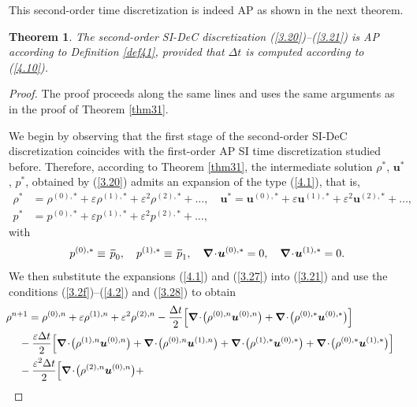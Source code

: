 \documentclass[preprint,12pt]{elsarticle}
\newtheorem{theorem}{Theorem}[section]
\def\bnabla{\bm{\nabla}}
\newcommand{\dt}{\Delta t}
\newcommand{\ve}{\varepsilon}
\newcommand\eref[1]{(\ref{#1})}
\newcommand*\xbar[1]{%
	\hbox{%
		\vbox{%
			\hrule height 0.5pt %
			\kern0.4ex%
			\hbox{%
				\kern-0.05em%
				\ensuremath{#1}%
				\kern-0.00em%
			}%
		}%
	}%
}
\begin{document}
This second-order time discretization is indeed AP as shown in the next theorem.
\begin{theorem}
	The second-order SI-DeC discretization \eref{3.20}--\eref{3.21} is AP according to Definition \ref{def41}, provided that $\dt$ is computed
	according to \eref{4.10}.
\end{theorem}
\begin{proof}
	The proof proceeds along the same lines and uses the same arguments as in the proof of Theorem \ref{thm31}.
	
	We begin by observing that the first stage of the second-order SI-DeC discretization coincides with the first-order AP SI time 
	discretization studied before. Therefore, according to Theorem \ref{thm31}, the intermediate solution $\rho^*$, $\bm u^*$, $p^*$, obtained 
	by \eref{3.20} admits an expansion of the type \eref{4.1}, that is,
	\begin{equation}
		\begin{aligned}
			\rho^*&=\rho^{(0),*}+\ve\rho^{(1),*}+\ve^2\rho^{(2),*}+\dots,\quad\bm u^*=\bm u^{(0),*}+\ve\bm u^{(1),*}+\ve^2\bm u^{(2),*}+\dots,\\
			p^*&=p^{(0),*}+\ve p^{(1),*}+\ve^2p^{(2),*}+\dots,
		\end{aligned}
		\label{3.27}
	\end{equation}
	with
	\begin{equation}
		p^{(0),*}\equiv\,\xbar p_0,\quad p^{(1),*}\equiv\,\xbar p_1,\quad\bnabla\!\cdot\!\bm u^{(0),*}=0,\quad\bnabla\!\cdot\!\bm u^{(1),*}=0.
		\label{3.28}
	\end{equation}
	We then substitute the expansions \eref{4.1} and \eref{3.27} into \eref{3.21} and use the conditions \eref{3.2f}--\eref{4.2} and \eref{3.28}
	to obtain
	\begin{align}
		&\hspace*{-0.1cm}\begin{aligned}
			\rho^{n+1}&=\rho^{(0),n}+\ve\rho^{(1),n}+\ve^2\rho^{(2),n}-\frac{\dt}{2}\Big[\bnabla\!\cdot\!\big(\rho^{(0),n}\bm u^{(0),n}\big)+
			\bnabla\!\cdot\!\big(\rho^{(0),*}\bm u^{(0),*}\big)\Big]\\
			&\hspace*{-0.3cm}-\frac{\ve\dt}{2}\Big[\bnabla\!\cdot\!\big(\rho^{(1),n}\bm u^{(0),n}\big)+
			\bnabla\!\cdot\!\big(\rho^{(0),n}\bm u^{(1),n}\big)+\bnabla\!\cdot\!\big(\rho^{(1),*}\bm u^{(0),*}\big)+
			\bnabla\!\cdot\!\big(\rho^{(0),*}\bm u^{(1),*}\big)\Big]\\
			&\hspace*{-0.3cm}-\frac{\ve^2\dt}{2}\Big[\bnabla\!\cdot\!\big(\rho^{(2),n}\bm u^{(0),n}\big)+

\end{aligned}
\end{align}
\end{proof}
\end{document}
